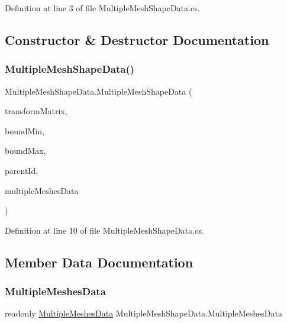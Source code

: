 Definition at line 3 of file Multiple\+Mesh\+Shape\+Data.\+cs.



\subsection{Constructor \& Destructor Documentation}
\mbox{\label{class_multiple_mesh_shape_data_a58d64b20953f7a4116e518e5dfa0c301}} 
\subsubsection{\texorpdfstring{MultipleMeshShapeData()}{MultipleMeshShapeData()}}
{\footnotesize\ttfamily Multiple\+Mesh\+Shape\+Data.\+Multiple\+Mesh\+Shape\+Data (\begin{DoxyParamCaption}\item[{Matrix4x4}]{transform\+Matrix,  }\item[{Vector3}]{bound\+Min,  }\item[{Vector3}]{bound\+Max,  }\item[{int}]{parent\+Id,  }\item[{\mbox{\hyperlink{class_multiple_meshes_data}{Multiple\+Meshes\+Data}}}]{multiple\+Meshes\+Data }\end{DoxyParamCaption})}



Definition at line 10 of file Multiple\+Mesh\+Shape\+Data.\+cs.



\subsection{Member Data Documentation}
\mbox{\label{class_multiple_mesh_shape_data_a2ffb02bda59bf4da93a025537d762b54}} 
\subsubsection{\texorpdfstring{MultipleMeshesData}{MultipleMeshesData}}
{\footnotesize\ttfamily readonly \mbox{\hyperlink{class_multiple_meshes_data}{Multiple\+Meshes\+Data}} Multiple\+Mesh\+Shape\+Data.\+Multiple\+Meshes\+Data}



